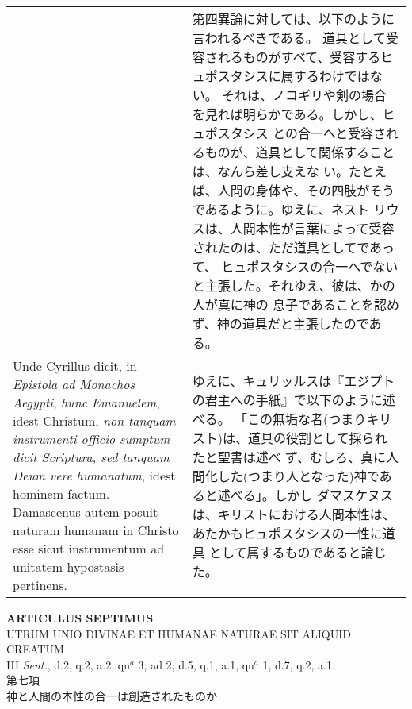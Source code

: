 \documentclass[10pt]{jsarticle} %
\begin{document}
\begin{longtable}{p{21em}p{21em}}
&

第四異論に対しては、以下のように言われるべきである。
道具として受容されるものがすべて、受容するヒュポスタシスに属するわけではない。
 それは、ノコギリや剣の場合を見れば明らかである。しかし、ヒュポスタシス
 との合一へと受容されるものが、道具として関係することは、なんら差し支えな
 い。たとえば、人間の身体や、その四肢がそうであるように。ゆえに、ネスト
 リウスは、人間本性が言葉によって受容されたのは、ただ道具としてであって、
 ヒュポスタシスの合一へでないと主張した。それゆえ、彼は、かの人が真に神の
 息子であることを認めず、神の道具だと主張したのである。

\\



 Unde
Cyrillus dicit, in {\itshape Epistola ad Monachos Aegypti}, {\itshape hunc Emanuelem}, idest
Christum, {\itshape non tanquam instrumenti officio sumptum dicit Scriptura, sed
tanquam Deum vere humanatum}, idest hominem factum. Damascenus autem
posuit naturam humanam in Christo esse sicut instrumentum ad unitatem
hypostasis pertinens.

&

ゆえに、キュリッルスは『エジプトの君主への手紙』で以下のように述べる。
 「この無垢な者(つまりキリスト)は、道具の役割として採られたと聖書は述べ
 ず、むしろ、真に人間化した(つまり人となった)神であると述べる」。しかし
 ダマスケヌスは、キリストにおける人間本性は、あたかもヒュポスタシスの一性に道具
 として属するものであると論じた。





\end{longtable}
\newpage





\begin{center}
 {\Large {\bf ARTICULUS SEPTIMUS}}\\
 {\large UTRUM UNIO DIVINAE ET HUMANAE NATURAE SIT ALIQUID CREATUM}\\
 {\footnotesize III {\itshape Sent.}, d.2, q.2, a.2, qu$^a$ 3, ad 2;
 d.5, q.1, a.1, qu$^a$ 1, d.7, q.2, a.1.}\\
 {\Large 第七項\\神と人間の本性の合一は創造されたものか}
\end{center}
\end{document}
